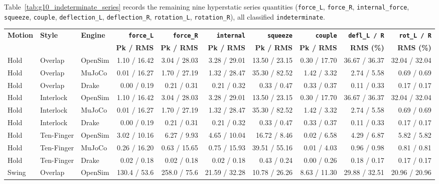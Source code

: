 \documentclass[11pt,a4paper]{article}
\begin{document}
Table~\ref{tab:g10_indeterminate_series} records the remaining nine hyperstatic series quantities (\texttt{force\_L}, \texttt{force\_R}, \texttt{internal\_force}, \texttt{squeeze}, \texttt{couple}, \texttt{deflection\_L}, \texttt{deflection\_R}, \texttt{rotation\_L}, \texttt{rotation\_R}), all classified \texttt{indeterminate}.

\begin{table}[htbp]
\centering
\scriptsize
\begin{tabular}{lllrrrrrrr}
\toprule
\textbf{Motion} & \textbf{Style} & \textbf{Engine} & \textbf{\texttt{force\_L}} & \textbf{\texttt{force\_R}} & \textbf{\texttt{internal}} & \textbf{\texttt{squeeze}} & \textbf{\texttt{couple}} & \textbf{\texttt{defl\_L / R}} & \textbf{\texttt{rot\_L / R}} \\
 &  &  & \textbf{Pk / RMS} & \textbf{Pk / RMS} & \textbf{Pk / RMS} & \textbf{Pk / RMS} & \textbf{Pk / RMS} & \textbf{RMS (\%)} & \textbf{RMS (\%)} \\
\midrule
Hold & Overlap & OpenSim & 1.10 / 16.42 & 3.04 / 28.03 & 3.28 / 29.01 & 13.50 / 23.15 & 0.30 / 17.70 & 36.67 / 36.37 & 32.04 / 32.04 \\
Hold & Overlap & MuJoCo & 0.01 / 16.27 & 1.70 / 27.19 & 1.32 / 28.47 & 35.30 / 82.52 & 1.42 / 3.32 & 2.74 / 5.58 & 0.69 / 0.69 \\
Hold & Overlap & Drake & 0.00 / 0.19 & 0.21 / 0.31 & 0.21 / 0.32 & 0.33 / 0.47 & 0.33 / 0.37 & 0.11 / 0.33 & 0.17 / 0.17 \\
Hold & Interlock & OpenSim & 1.10 / 16.42 & 3.04 / 28.03 & 3.28 / 29.01 & 13.50 / 23.15 & 0.30 / 17.70 & 36.67 / 36.37 & 32.04 / 32.04 \\
Hold & Interlock & MuJoCo & 0.01 / 16.27 & 1.70 / 27.19 & 1.32 / 28.47 & 35.30 / 82.52 & 1.42 / 3.32 & 2.74 / 5.58 & 0.69 / 0.69 \\
Hold & Interlock & Drake & 0.00 / 0.19 & 0.21 / 0.31 & 0.21 / 0.32 & 0.33 / 0.47 & 0.33 / 0.37 & 0.11 / 0.33 & 0.17 / 0.17 \\
Hold & Ten-Finger & OpenSim & 3.02 / 10.16 & 6.27 / 9.93 & 4.65 / 10.04 & 16.72 / 8.46 & 0.02 / 6.58 & 4.29 / 6.87 & 5.82 / 5.82 \\
Hold & Ten-Finger & MuJoCo & 0.26 / 16.20 & 0.63 / 15.65 & 0.75 / 15.93 & 39.51 / 55.16 & 0.01 / 4.03 & 0.96 / 0.98 & 0.81 / 0.81 \\
Hold & Ten-Finger & Drake & 0.02 / 0.18 & 0.02 / 0.18 & 0.02 / 0.18 & 0.43 / 0.24 & 0.00 / 0.26 & 0.18 / 0.17 & 0.17 / 0.17 \\
\midrule
Swing & Overlap & OpenSim & 130.4 / 53.6 & 258.0 / 75.6 & 21.59 / 32.28 & 10.78 / 26.26 & 8.63 / 11.30 & 29.88 / 32.51 & 20.96 / 20.96 \\

\end{tabular}
\end{table}
\end{document}
